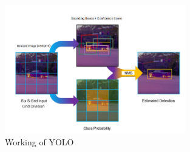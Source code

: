 %
\begin{figure}[h!]
    \centering
    \includegraphics[width=0.7\textwidth]{images/Yolo Architecture.png}
    \caption{Working of YOLO}
\end{figure}
%
%
%